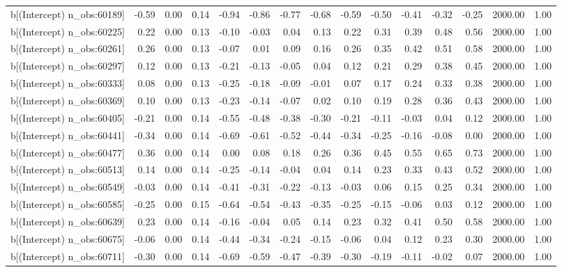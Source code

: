 \begin{table}[ht]
\begin{tabular}{rrrrrrrrrrrrrrr}
  b[(Intercept) n\_obs:60189] & -0.59 & 0.00 & 0.14 & -0.94 & -0.86 & -0.77 & -0.68 & -0.59 & -0.50 & -0.41 & -0.32 & -0.25 & 2000.00 & 1.00 \\ 
  b[(Intercept) n\_obs:60225] & 0.22 & 0.00 & 0.13 & -0.10 & -0.03 & 0.04 & 0.13 & 0.22 & 0.31 & 0.39 & 0.48 & 0.56 & 2000.00 & 1.00 \\ 
  b[(Intercept) n\_obs:60261] & 0.26 & 0.00 & 0.13 & -0.07 & 0.01 & 0.09 & 0.16 & 0.26 & 0.35 & 0.42 & 0.51 & 0.58 & 2000.00 & 1.00 \\ 
  b[(Intercept) n\_obs:60297] & 0.12 & 0.00 & 0.13 & -0.21 & -0.13 & -0.05 & 0.04 & 0.12 & 0.21 & 0.29 & 0.38 & 0.45 & 2000.00 & 1.00 \\ 
  b[(Intercept) n\_obs:60333] & 0.08 & 0.00 & 0.13 & -0.25 & -0.18 & -0.09 & -0.01 & 0.07 & 0.17 & 0.24 & 0.33 & 0.38 & 2000.00 & 1.00 \\ 
  b[(Intercept) n\_obs:60369] & 0.10 & 0.00 & 0.13 & -0.23 & -0.14 & -0.07 & 0.02 & 0.10 & 0.19 & 0.28 & 0.36 & 0.43 & 2000.00 & 1.00 \\ 
  b[(Intercept) n\_obs:60405] & -0.21 & 0.00 & 0.14 & -0.55 & -0.48 & -0.38 & -0.30 & -0.21 & -0.11 & -0.03 & 0.04 & 0.12 & 2000.00 & 1.00 \\ 
  b[(Intercept) n\_obs:60441] & -0.34 & 0.00 & 0.14 & -0.69 & -0.61 & -0.52 & -0.44 & -0.34 & -0.25 & -0.16 & -0.08 & 0.00 & 2000.00 & 1.00 \\ 
  b[(Intercept) n\_obs:60477] & 0.36 & 0.00 & 0.14 & 0.00 & 0.08 & 0.18 & 0.26 & 0.36 & 0.45 & 0.55 & 0.65 & 0.73 & 2000.00 & 1.00 \\ 
  b[(Intercept) n\_obs:60513] & 0.14 & 0.00 & 0.14 & -0.25 & -0.14 & -0.04 & 0.04 & 0.14 & 0.23 & 0.33 & 0.43 & 0.52 & 2000.00 & 1.00 \\ 
  b[(Intercept) n\_obs:60549] & -0.03 & 0.00 & 0.14 & -0.41 & -0.31 & -0.22 & -0.13 & -0.03 & 0.06 & 0.15 & 0.25 & 0.34 & 2000.00 & 1.00 \\ 
  b[(Intercept) n\_obs:60585] & -0.25 & 0.00 & 0.15 & -0.64 & -0.54 & -0.43 & -0.35 & -0.25 & -0.15 & -0.06 & 0.03 & 0.12 & 2000.00 & 1.00 \\ 
  b[(Intercept) n\_obs:60639] & 0.23 & 0.00 & 0.14 & -0.16 & -0.04 & 0.05 & 0.14 & 0.23 & 0.32 & 0.41 & 0.50 & 0.58 & 2000.00 & 1.00 \\ 
  b[(Intercept) n\_obs:60675] & -0.06 & 0.00 & 0.14 & -0.44 & -0.34 & -0.24 & -0.15 & -0.06 & 0.04 & 0.12 & 0.23 & 0.30 & 2000.00 & 1.00 \\ 
  b[(Intercept) n\_obs:60711] & -0.30 & 0.00 & 0.14 & -0.69 & -0.59 & -0.47 & -0.39 & -0.30 & -0.19 & -0.11 & -0.02 & 0.07 & 2000.00 & 1.00 \\ 

\end{tabular}
\end{table}
